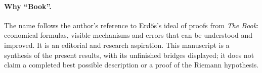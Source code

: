\documentclass[11pt]{article}
\theoremstyle{definition}\newtheorem{definition}[theorem]{Definition}
\theoremstyle{remark}\newtheorem{remark}[theorem]{Remark}
\numberwithin{equation}{section}
\begin{document}
\paragraph{Why ``Book''.}
The name follows the author's reference to Erd\H{o}s's ideal of proofs
from \emph{The Book}: economical formulas, visible mechanisms and errors
that can be understood and improved. It is an editorial and research
aspiration. This manuscript is a synthesis of the present results, with
its unfinished bridges displayed; it does not claim a completed best
possible description or a proof of the Riemann hypothesis.








\appendix


\end{document}

